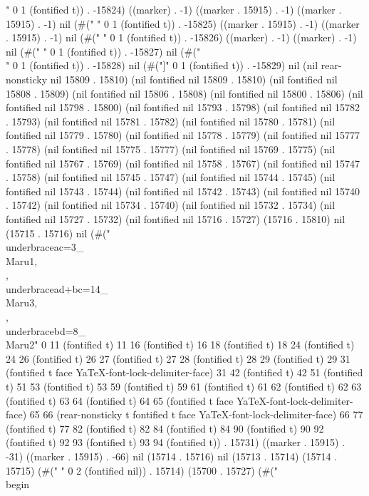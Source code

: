 " 0 1 (fontified t)) . -15824) ((marker) . -1) ((marker . 15915) . -1) ((marker . 15915) . -1) nil (#(" " 0 1 (fontified t)) . -15825) ((marker . 15915) . -1) ((marker . 15915) . -1) nil (#("
" 0 1 (fontified t)) . -15826) ((marker) . -1) ((marker) . -1) nil (#(" " 0 1 (fontified t)) . -15827) nil (#("\\" 0 1 (fontified t)) . -15828) nil (#("]" 0 1 (fontified t)) . -15829) nil (nil rear-nonsticky nil 15809 . 15810) (nil fontified nil 15809 . 15810) (nil fontified nil 15808 . 15809) (nil fontified nil 15806 . 15808) (nil fontified nil 15800 . 15806) (nil fontified nil 15798 . 15800) (nil fontified nil 15793 . 15798) (nil fontified nil 15782 . 15793) (nil fontified nil 15781 . 15782) (nil fontified nil 15780 . 15781) (nil fontified nil 15779 . 15780) (nil fontified nil 15778 . 15779) (nil fontified nil 15777 . 15778) (nil fontified nil 15775 . 15777) (nil fontified nil 15769 . 15775) (nil fontified nil 15767 . 15769) (nil fontified nil 15758 . 15767) (nil fontified nil 15747 . 15758) (nil fontified nil 15745 . 15747) (nil fontified nil 15744 . 15745) (nil fontified nil 15743 . 15744) (nil fontified nil 15742 . 15743) (nil fontified nil 15740 . 15742) (nil fontified nil 15734 . 15740) (nil fontified nil 15732 . 15734) (nil fontified nil 15727 . 15732) (nil fontified nil 15716 . 15727) (15716 . 15810) nil (15715 . 15716) nil (#("\\underbrace{ac=3}_{\\Maru{1}},\\,\\underbrace{ad+bc=14}_{\\Maru{3}},\\,\\underbrace{bd=8}_{\\Maru{2}}" 0 11 (fontified t) 11 16 (fontified t) 16 18 (fontified t) 18 24 (fontified t) 24 26 (fontified t) 26 27 (fontified t) 27 28 (fontified t) 28 29 (fontified t) 29 31 (fontified t face YaTeX-font-lock-delimiter-face) 31 42 (fontified t) 42 51 (fontified t) 51 53 (fontified t) 53 59 (fontified t) 59 61 (fontified t) 61 62 (fontified t) 62 63 (fontified t) 63 64 (fontified t) 64 65 (fontified t face YaTeX-font-lock-delimiter-face) 65 66 (rear-nonsticky t fontified t face YaTeX-font-lock-delimiter-face) 66 77 (fontified t) 77 82 (fontified t) 82 84 (fontified t) 84 90 (fontified t) 90 92 (fontified t) 92 93 (fontified t) 93 94 (fontified t)) . 15731) ((marker . 15915) . -31) ((marker . 15915) . -66) nil (15714 . 15716) nil (15713 . 15714) (15714 . 15715) (#("  " 0 2 (fontified nil)) . 15714) (15700 . 15727) (#("\\begin{}
